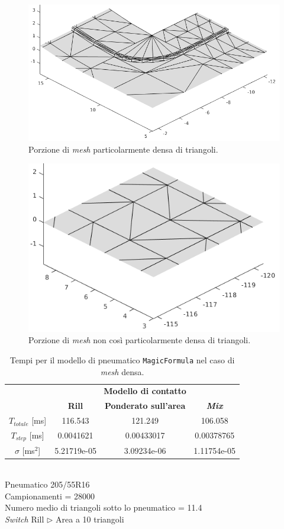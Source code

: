 \begin{figure}
	\centering
	\includegraphics[width=0.6\linewidth]{Figures/mesh_dense}
	\caption{Porzione di \textit{mesh} particolarmente densa di triangoli.}
	\label{meshdense}
\end{figure}
\begin{figure}
	\centering
	\includegraphics[width=0.6\linewidth]{Figures/mesh_notsodense}
	\caption{Porzione di \textit{mesh} non così particolarmente densa di triangoli.}
	\label{meshnotsodense}
\end{figure}
%
\clearpage
%
\begin{table}
	\centering
	\begin{tabular}{c|c|c|c|}
		\cline{2-4} 
		& \multicolumn{3}{c|}{\textbf{Modello di contatto}} \\
		\cline{2-4} 
		& \textbf{Rill} & \textbf{Ponderato sull'area} & \textbf{\textit{Mix}} \\ 
		\hline
		\multicolumn{1}{|c|}{$T_{totale}$ [ms]} & 116.543 & 121.249 & 106.058 \\ 
		\hline 
		\multicolumn{1}{|c|}{$T_{step}$ [ms]} & 0.0041621 & 0.00433017 & 0.00378765 \\ 
		\hline 
		\multicolumn{1}{|c|}{$\sigma$ [ms$^2$]} & 5.21719e-05 & 3.09234e-06 & 1.11754e-05 \\ 
		\hline
	\end{tabular}
	\\[0.5cm]
	Pneumatico 205/55R16\\
	Campionamenti = 28000\\
	Numero medio di triangoli sotto lo pneumatico = 11.4\\
	\textit{Switch} Rill $\triangleright$ Area a 10 triangoli
	\caption{Tempi per il modello di pneumatico \texttt{MagicFormula} nel caso di \textit{mesh} densa.}
	\label{MFcordolo}
\end{table}
